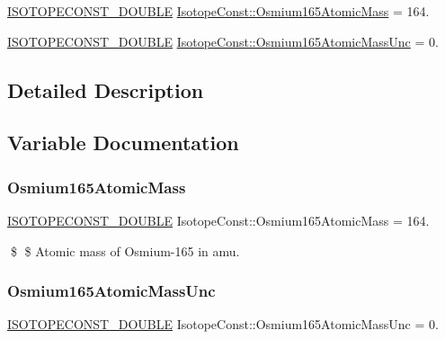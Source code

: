 \begin{DoxyCompactItemize}
\item 
\mbox{\hyperlink{group___isotope_const-_macros_ga8f45a7272ce02c0b4c65c44636ed719a}{I\+S\+O\+T\+O\+P\+E\+C\+O\+N\+S\+T\+\_\+\+D\+O\+U\+B\+LE}} \mbox{\hyperlink{group___isotope_const-_osmium-_os165_ga347574a9b1a12c410ae9ccce1527ee55}{Isotope\+Const\+::\+Osmium165\+Atomic\+Mass}} = 164.
\item 
\mbox{\hyperlink{group___isotope_const-_macros_ga8f45a7272ce02c0b4c65c44636ed719a}{I\+S\+O\+T\+O\+P\+E\+C\+O\+N\+S\+T\+\_\+\+D\+O\+U\+B\+LE}} \mbox{\hyperlink{group___isotope_const-_osmium-_os165_ga7e0452eab370d05fd45d8cb9c05c082d}{Isotope\+Const\+::\+Osmium165\+Atomic\+Mass\+Unc}} = 0.
\end{DoxyCompactItemize}


\subsection{Detailed Description}


\subsection{Variable Documentation}
\mbox{\label{group___isotope_const-_osmium-_os165_ga347574a9b1a12c410ae9ccce1527ee55}} 
\subsubsection{\texorpdfstring{Osmium165\+Atomic\+Mass}{Osmium165AtomicMass}}
{\footnotesize\ttfamily \mbox{\hyperlink{group___isotope_const-_macros_ga8f45a7272ce02c0b4c65c44636ed719a}{I\+S\+O\+T\+O\+P\+E\+C\+O\+N\+S\+T\+\_\+\+D\+O\+U\+B\+LE}} Isotope\+Const\+::\+Osmium165\+Atomic\+Mass = 164.}

\$ \$ Atomic mass of Osmium-\/165 in amu. \mbox{\label{group___isotope_const-_osmium-_os165_ga7e0452eab370d05fd45d8cb9c05c082d}} 
\subsubsection{\texorpdfstring{Osmium165\+Atomic\+Mass\+Unc}{Osmium165AtomicMassUnc}}
{\footnotesize\ttfamily \mbox{\hyperlink{group___isotope_const-_macros_ga8f45a7272ce02c0b4c65c44636ed719a}{I\+S\+O\+T\+O\+P\+E\+C\+O\+N\+S\+T\+\_\+\+D\+O\+U\+B\+LE}} Isotope\+Const\+::\+Osmium165\+Atomic\+Mass\+Unc = 0.}

